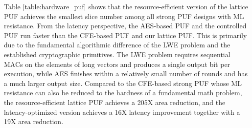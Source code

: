Table \ref{table:hardware_puf} shows that the resource-efficient version of the lattice PUF achieves the smallest slice number among all strong PUF designs with ML resistance.
From the latency perspective, the AES-based PUF and the controlled PUF run faster than the CFE-based PUF and our lattice PUF. This is primarily due to the fundamental algorithmic difference of the LWE problem and the established cryptographic primitives. The LWE problem requires sequential MACs on the elements of long vectors and produces a single output bit per execution, while AES finishes within a relatively small number of rounds and has a much larger output size.
Compared to the CFE-based strong PUF whose ML resistance can also be reduced to the hardness of a fundamental math problem, the resource-efficient lattice PUF achieves a 205X area reduction, and the latency-optimized version achieves a 16X latency improvement together with a 19X area reduction.

